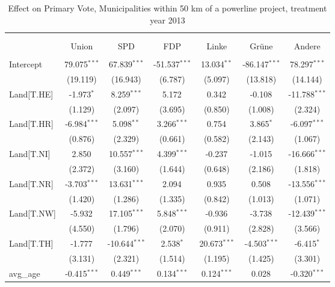 \begin{table}[!htbp] \centering
  \caption{Effect on Primary Vote, Municipalities within 50 km of a powerline project, treatment year 2013}
\begin{tabular}{@{\extracolsep{5pt}}lcccccc}
\\[-1.8ex]\hline
\hline \\[-1.8ex]
\\[-1.8ex] & \multicolumn{1}{c}{Union} & \multicolumn{1}{c}{SPD} & \multicolumn{1}{c}{FDP} & \multicolumn{1}{c}{Linke} & \multicolumn{1}{c}{Grüne} & \multicolumn{1}{c}{Andere}  \\
\hline \\[-1.8ex]
 Intercept & 79.075$^{***}$ & 67.839$^{***}$ & -51.537$^{***}$ & 13.034$^{**}$ & -86.147$^{***}$ & 78.297$^{***}$ \\
  & (19.119) & (16.943) & (6.787) & (5.097) & (13.818) & (14.144) \\
 Land[T.HE] & -1.973$^{*}$ & 8.259$^{***}$ & 5.172$^{}$ & 0.342$^{}$ & -0.108$^{}$ & -11.788$^{***}$ \\
  & (1.129) & (2.097) & (3.695) & (0.850) & (1.008) & (2.324) \\
 Land[T.HR] & -6.984$^{***}$ & 5.098$^{**}$ & 3.266$^{***}$ & 0.754$^{}$ & 3.865$^{*}$ & -6.097$^{***}$ \\
  & (0.876) & (2.329) & (0.661) & (0.582) & (2.143) & (1.067) \\
 Land[T.NI] & 2.850$^{}$ & 10.557$^{***}$ & 4.399$^{***}$ & -0.237$^{}$ & -1.015$^{}$ & -16.666$^{***}$ \\
  & (2.372) & (3.160) & (1.644) & (0.648) & (2.186) & (1.818) \\
 Land[T.NR] & -3.703$^{***}$ & 13.631$^{***}$ & 2.094$^{}$ & 0.935$^{}$ & 0.508$^{}$ & -13.556$^{***}$ \\
  & (1.420) & (1.286) & (1.335) & (0.842) & (1.013) & (1.071) \\
 Land[T.NW] & -5.932$^{}$ & 17.105$^{***}$ & 5.848$^{***}$ & -0.936$^{}$ & -3.738$^{}$ & -12.439$^{***}$ \\
  & (4.550) & (1.796) & (2.070) & (0.911) & (2.828) & (3.566) \\
 Land[T.TH] & -1.777$^{}$ & -10.644$^{***}$ & 2.538$^{*}$ & 20.673$^{***}$ & -4.503$^{***}$ & -6.415$^{*}$ \\
  & (3.131) & (2.321) & (1.514) & (1.195) & (1.425) & (3.301) \\
 avg_age & -0.415$^{***}$ & 0.449$^{***}$ & 0.134$^{***}$ & 0.124$^{***}$ & 0.028$^{}$ & -0.320$^{***}$ \\

\end{tabular}
\end{table}
